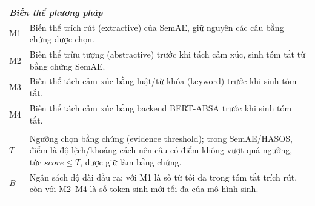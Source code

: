\documentclass[12pt,a4paper]{report}
\begin{document}
\begin{longtable}{p{} p{}}
\multicolumn{2}{l}{\textit{\textbf{Biến thể phương pháp}}} \\
\addlinespace[2pt]
M1 & Biến thể trích rút (extractive) của SemAE, giữ nguyên các câu bằng chứng được chọn. \\
M2 & Biến thể trừu tượng (abstractive) trước khi tách cảm xúc, sinh tóm tắt từ bằng chứng SemAE. \\
M3 & Biến thể tách cảm xúc bằng luật/từ khóa (keyword) trước khi sinh tóm tắt. \\
M4 & Biến thể tách cảm xúc bằng backend BERT-ABSA trước khi sinh tóm tắt. \\
\addlinespace[3pt]

\multicolumn{2}{l}{\textit{\textbf{Tham số}}} \\
\addlinespace[2pt]
$T$ & Ngưỡng chọn bằng chứng (evidence threshold); trong SemAE/HASOS, điểm là độ lệch/khoảng cách nên câu có điểm không vượt quá ngưỡng, tức $score \leq T$, được giữ làm bằng chứng. \\
$B$ & Ngân sách độ dài đầu ra; với M1 là số từ tối đa trong tóm tắt trích rút, còn với M2--M4 là số token sinh mới tối đa của mô hình sinh. \\
\addlinespace[3pt]


\end{longtable}
\end{document}
